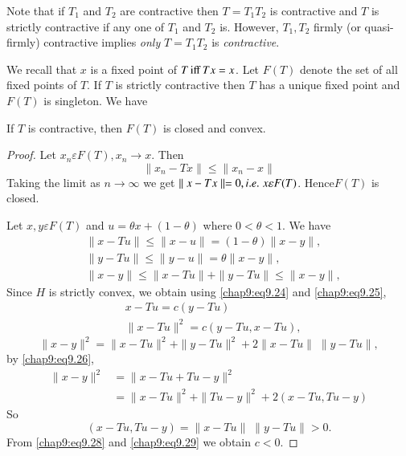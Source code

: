 Note that if $T_1$ and $T_2$ are contractive then $T=T_1 T_2$ is
contractive and $T$ is strictly contractive if any one of $T_1$ and
$T_2$ is. However, $T_1, T_2$ firmly (or quasi-firmly) contractive
implies \emph{only} $T=T_1 T_2$ is \emph{contractive}.

 We recall that $x$ is a fixed point of $T \operatorname{iff}
Tx=x$. Let $F(T)$ denote the set of all fixed points of $T$. If $T$ is
strictly contractive then $T$ has a unique fixed point and $F(T)$ is
singleton. We have 

\begin{THM}\label{chap9:THM3}
If $T$ is contractive, then $F(T)$ is closed and convex.
\end{THM}

\begin{proof}
Let $x_n\varepsilon F(T), x_n\to x$. Then 
$$
\parallel x_n-Tx\parallel \leq \parallel x_n-x\parallel
$$
Taking the limit as $n\to\infty$ we get $\parallel x-Tx\parallel=0,
{i.e.}\kern.3em x\varepsilon F(T)$. Hence\pageoriginale $F(T)$ is closed.

Let $x, y \varepsilon F(T)$ and $u=\theta x+(1-\theta)$ where
$0<\theta <1$. We have 
\begin{align}
&\parallel x-Tu\parallel \leq\parallel x-u\parallel=(1-\theta)
\parallel x-y\parallel, \label{chap9:eq9.24}\\
&\parallel y-Tu\parallel \leq\parallel y-u\parallel=\theta \parallel
x-y\parallel, \label{chap9:eq9.25}\\
&\parallel x-y\parallel\leq\parallel x-Tu\parallel +\parallel
y-Tu\parallel \leq\parallel x-y\parallel, \label{chap9:eq9.26}
\end{align}
Since $H$ is strictly convex, we obtain using \eqref{chap9:eq9.24} and
\eqref{chap9:eq9.25}, 
\begin{align}
&x-Tu=c(y-Tu)\label{chap9:eq9.27}\\
&\parallel x-Tu\parallel^2=c(y-Tu,x-Tu), \label{chap9:eq9.28}
\end{align}
$$
\parallel x-y\parallel^2=\parallel x-Tu\parallel^2+\parallel y-Tu
\parallel^2+2\parallel x-Tu\parallel \;\parallel y-Tu\parallel,
$$
by \eqref{chap9:eq9.26},
\begin{align*}
\parallel x-y\parallel^2 &= \parallel x-Tu+Tu-y\parallel^2\\
&= \parallel x-Tu\parallel^2 +\parallel Tu-y\parallel^2 +2(x-Tu, Tu-y) 
\end{align*}
So
\begin{equation}\label{chap9:eq9.29}
(x-Tu, Tu-y)=\parallel x-Tu\parallel \; \parallel y-Tu\parallel >0.
\end{equation}
From \eqref{chap9:eq9.28} and \eqref{chap9:eq9.29} we obtain $c<0$.


\end{proof}
